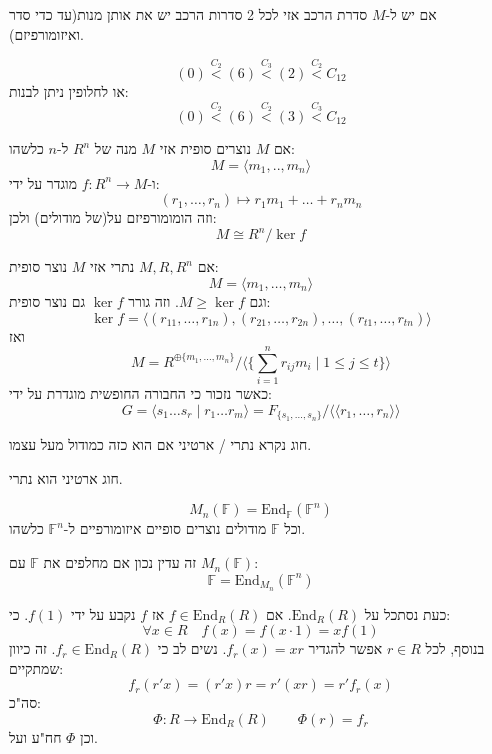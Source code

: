 \documentclass{tstextbook}
\begin{document}
\begin{theorem}
אם יש ל-\(M\) סדרת הרכב אזי לכל 2 סדרות הרכב יש את אותן מנות(עד כדי סדר ואיזומורפיזם).

\end{theorem}
\begin{example}
$$(0)\overset{C_{2}}{<}(6)\overset{C_{3}}{<}  (2)\overset{C_{2}}{<}   C_{12}$$
או לחלופין ניתן לבנות:
$$(0)\overset{C_{2}}{<} (6) \overset{C_{2}}{<} (3)\overset{C_{3}}{<} C_{12}$$

\end{example}
אם \(M\) נוצרים סופית אזי \(M\) מנה של \(R^{n}\) ל-\(n\) כלשהו:
$$M=\langle m_{1},..,m_{n} \rangle $$
ו-\(f:R^{n}\to M\) מוגדר על ידי:
$$(r_{1},\dots,r_{n})\mapsto r_{1}m_{1}+\dots+r_{n}m_{n}$$
וזה הומומורפיזם על(של מודולים) ולכן:
$$M\cong  R^{n} / \ker f$$

\begin{proposition}
אם \(M,R,R^{n}\) נתרי אזי \(M\) נוצר סופית:
$$M=\langle m_{1},\dots,m_{n} \rangle $$
וגם \(M\geq \ker f\). וזה גורר \(\ker f\) גם נוצר סופית:
$$\ker f=\langle  (r_{11},\dots,r_{1n}),(r_{21},\dots,r_{2n}), \dots, (r_{t1},\dots,r_{tn})\rangle $$
ואז 
$$M=R^{\oplus \{ m_{1},\dots,m_{n} \}} /\langle \{ \sum\limits_{i=1}^{n}r_{ij}m_{i}\mid 1\leq j\leq t \} \rangle $$
כאשר נזכור כי החבורה החופשית מוגדרת על ידי:
$$G=\langle s_{1}\dots s_{r}\mid r_{1}\dots r_{m} \rangle = F_{\{ s_{1},\dots,s_{n} \}} / \langle \langle r_{1},\dots,r_{n} \rangle  \rangle $$

\end{proposition}
\begin{definition}
חוג נקרא נתרי / ארטיני אם הוא כזה כמודול מעל עצמו.

\end{definition}
\begin{theorem}
חוג ארטיני הוא נתרי.

\end{theorem}
\begin{proposition}
$$M_{n}(\mathbb{F} )=\mathrm{End}_{\mathbb{F} }(\mathbb{F} ^{n})$$
וכל \(\mathbb{F}\) מודולים נוצרים סופיים איזומורפיים ל-\(\mathbb{F}^{n}\) כלשהו.

\end{proposition}
\begin{remark}
זה עדין נכון אם מחלפים את \(\mathbb{F}\) עם \(M_{n}(\mathbb{F})\):
$$\mathbb{F} = \mathrm{End}_{M_{n}}(\mathbb{F}^{n} )$$

\end{remark}
כעת נסתכל על \(\mathrm{End}_{R}(R)\). אם \(f \in \mathrm{End}_{R}(R)\) אז \(f\) נקבע על ידי \(f(1)\). כי:
$$\forall x \in R\quad f(x)=f(x\cdot 1)=xf(1)$$
בנוסף, לכל \(r \in R\) אפשר להגדיר \(f_{r}(x)=xr\). נשים לב כי \(f_{r}\in \mathrm{End}_{R}(R)\). זה כיוון שמתקיים:
$$f_{r}(r'x)=(r'x)r=r'(xr)=r'f_{r}(x)$$
סה"כ:
$$\Phi:R\to \mathrm{End}_{R}(R)\qquad \Phi(r)=f_{r}$$
וכן \(\Phi\) חח"ע ועל.
\end{document}
